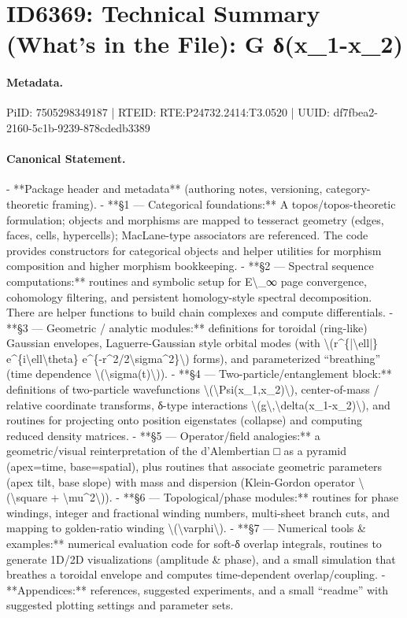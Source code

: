 \section*{ID6369: Technical Summary (What’s in the File): G δ(x\_1-x\_2)}
\paragraph{Metadata.}
PiID: 7505298349187 | RTEID: RTE:P24732.2414:T3.0520 | UUID: df7fbea2-2160-5c1b-9239-878cdedb3389

\paragraph{Canonical Statement.}
- **Package header and metadata** (authoring notes, versioning, category-theoretic framing). - **§1 — Categorical foundations:** A topos/topos-theoretic formulation; objects and morphisms are mapped to tesseract geometry (edges, faces, cells, hypercells); MacLane-type associators are referenced. The code provides constructors for categorical objects and helper utilities for morphism composition and higher morphism bookkeeping. - **§2 — Spectral sequence computations:** routines and symbolic setup for E\textbackslash{}\_∞ page convergence, cohomology filtering, and persistent homology-style spectral decomposition. There are helper functions to build chain complexes and compute differentials. - **§3 — Geometric / analytic modules:** definitions for toroidal (ring-like) Gaussian envelopes, Laguerre-Gaussian style orbital modes (with \textbackslash{}(r\textasciicircum{}\{|\textbackslash{}ell|\} e\textasciicircum{}\{i\textbackslash{}ell\textbackslash{}theta\} e\textasciicircum{}\{-r\textasciicircum{}2/2\textbackslash{}sigma\textasciicircum{}2\}\textbackslash{}) forms), and parameterized “breathing” (time dependence \textbackslash{}(\textbackslash{}sigma(t)\textbackslash{})). - **§4 — Two-particle/entanglement block:** definitions of two-particle wavefunctions \textbackslash{}(\textbackslash{}Psi(x\_1,x\_2)\textbackslash{}), center-of-mass / relative coordinate transforms, δ-type interactions \textbackslash{}(g\textbackslash{},\textbackslash{}delta(x\_1-x\_2)\textbackslash{}), and routines for projecting onto position eigenstates (collapse) and computing reduced density matrices. - **§5 — Operator/field analogies:** a geometric/visual reinterpretation of the d’Alembertian □ as a pyramid (apex=time, base=spatial), plus routines that associate geometric parameters (apex tilt, base slope) with mass and dispersion (Klein-Gordon operator \textbackslash{}(\textbackslash{}square + \textbackslash{}mu\textasciicircum{}2\textbackslash{})). - **§6 — Topological/phase modules:** routines for phase windings, integer and fractional winding numbers, multi-sheet branch cuts, and mapping to golden-ratio winding \textbackslash{}(\textbackslash{}varphi\textbackslash{}). - **§7 — Numerical tools \& examples:** numerical evaluation code for soft-δ overlap integrals, routines to generate 1D/2D visualizations (amplitude \& phase), and a small simulation that breathes a toroidal envelope and computes time-dependent overlap/coupling. - **Appendices:** references, suggested experiments, and a small “readme” with suggested plotting settings and parameter sets.

